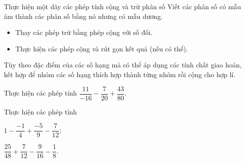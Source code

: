 \begin{dang}{Thực hiện một dãy các phép tính cộng và trừ phân số}
	Viết các phân số có mẫu âm thành các phân số bằng nó nhưng có mẫu dương.
	\begin{itemize}
		\item Thay các phép trừ bằng phép cộng với số đối.
		\item Thực hiện các phép cộng và rút gọn kết quả (nếu có thể).
	\end{itemize}
\begin{note}
	Tùy theo đặc điểm của các số hạng mà có thể áp dụng các tính chất giao hoán, kết hợp để nhóm các số hạng thích hợp thành từng nhóm rồi cộng cho hợp lí.
\end{note}
	\end{dang}
\begin{vd}%
	Thực hiện các phép tính $\dfrac{11}{-16}-\dfrac{7}{20}+\dfrac{43}{80}$.
\end{vd}
\begin{vd}%
	Thực hiện các phép tính
	\begin{enumEX}{2}
		\item $1-\dfrac{-1}{4}+\dfrac{-5}{9}-\dfrac{7}{12}$;
		\item $\dfrac{25}{48}+\dfrac{7}{12}-\dfrac{9}{16}-\dfrac{1}{8}$.
		\end{enumEX}
\end{vd}
